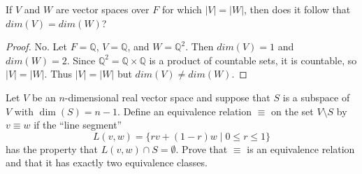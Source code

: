 \begin{tcolorbox}[title=Problem 18, breakable]
    If $V$ and $W$ are vector spaces over $F$ for which $|V| = |W|$, then does it
    follow that $dim(V) = dim(W)$?
\end{tcolorbox}

\begin{proof}
    No. Let $F = \mathbb{Q}$, $V = \mathbb{Q}$, and $W = \mathbb{Q}^2$.
    Then $dim(V) = 1$ and $dim(W) = 2$.
    Since $\mathbb{Q}^2 = \mathbb{Q} \times \mathbb{Q}$ is a product of countable sets, it is countable, so $|V| = |W|$.
    Thus $|V| = |W|$ but $dim(V) \neq dim(W)$.
\end{proof}

\begin{tcolorbox}[title=Problem 19, breakable]
    Let $V$ be an $n$-dimensional real vector space and suppose that $S$ is a subspace of
    $V$ with $\dim(S) = n - 1$. Define an equivalence relation $\equiv$ on the set
    $V \setminus S$ by $v \equiv w$ if the ``line segment''
    \[
        L(v, w) = \{rv + (1 - r)w \mid 0 \le r \le 1\}
    \]
    has the property that $L(v, w) \cap S = \emptyset$. Prove that $\equiv$ is an
    equivalence relation and that it has exactly two equivalence classes.
\end{tcolorbox}

